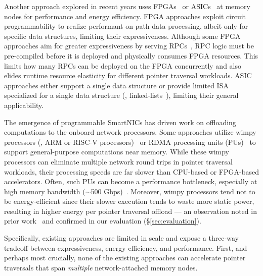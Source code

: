 Another approach explored in recent years uses FPGAs~\cite{clio,strom} or ASICs~\cite{impica, walkers} at memory nodes for performance and energy efficiency. FPGA approaches exploit circuit programmability to realize performant on-path data processing, albeit only for specific data structures, limiting their expressiveness. Although some FPGA approaches aim for greater expressiveness by serving RPCs~\cite{coyote}, RPC logic must be pre-compiled before it is deployed and physically consumes FPGA resources. This limits how many RPCs can be deployed on the FPGA concurrently and also elides runtime resource elasticity for different pointer traversal workloads. ASIC approaches either support a single data structure or provide limited ISA specialized for a single data structure (\eg, linked-lists~\cite{walkers}), limiting their general applicability. 

 The emergence of programmable SmartNICs has driven work on offloading computations to the onboard network processors. Some approaches utilize wimpy processors (\eg, ARM or RISC-V processors)~\cite{rmc_hotnets20} or RDMA processing units (PUs)~\cite{redn} to support general-purpose computations near memory. While these wimpy processors can eliminate multiple network round trips in pointer traversal workloads, their processing speeds are far slower than CPU-based or FPGA-based accelerators. Often, such PUs can become a performance bottleneck, especially at high memory bandwidth ($\sim$500 Gbps)~\cite{redn, disagg}. Moreover, wimpy processors tend not to be energy-efficient since their slower execution tends to waste more static power, resulting in higher energy per pointer traversal offload --- an observation noted in prior work~\cite{clio} and confirmed in our evaluation (\S\ref{sec:evaluation}). 

Specifically, existing approaches are limited in scale and expose a three-way tradeoff between expressiveness, energy efficiency, and performance. First, and perhaps most crucially, none of the existing approaches can accelerate pointer traversals that span \emph{multiple} network-attached memory nodes. 


